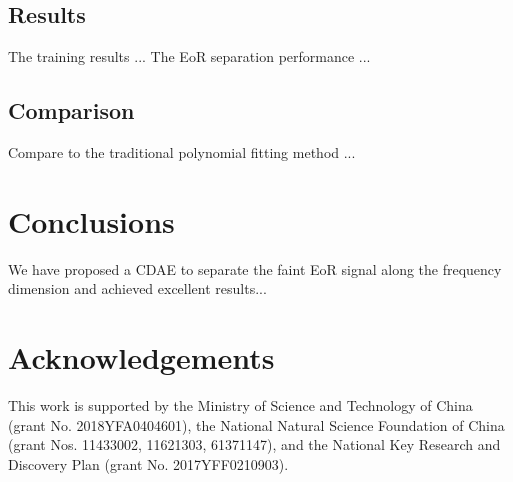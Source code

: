 \documentclass[letters,a4paper,fleqn,usenatbib]{mnras}
\begin{document}
\subsection{Results}
\label{sec:results}

The training results ...
The EoR separation performance ...


\subsection{Comparison}
\label{sec:comparison}

Compare to the traditional polynomial fitting method ...


\section{Conclusions}
\label{sec:conclusions}

We have proposed a CDAE to separate the faint EoR signal along the
frequency dimension and achieved excellent results...


\section*{Acknowledgements}

This work is supported by
the Ministry of Science and Technology of China
(grant No. 2018YFA0404601),
the National Natural Science Foundation of China
(grant Nos. 11433002, 11621303, 61371147),
and the National Key Research and Discovery Plan
(grant No. 2017YFF0210903).










\bsp	%
\label{lastpage}
\end{document}
